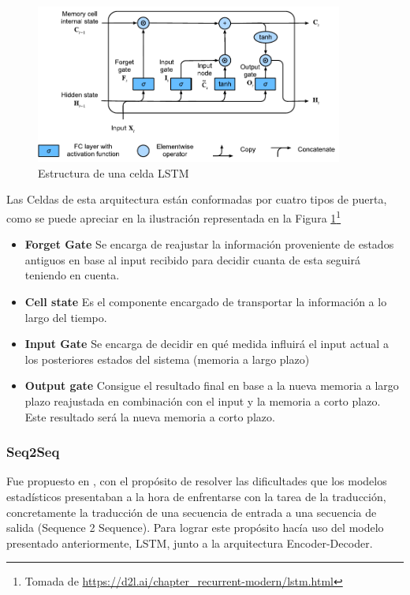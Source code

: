 \begin{figure}[h]
	\centering
	\includegraphics[width = 0.9\textwidth]{Imagenes/Vectorial/LSTM.pdf}
	\caption{Estructura de una celda LSTM}%
	\label{fig:LSTM}
\end{figure}

Las Celdas de esta arquitectura están conformadas por cuatro tipos de puerta, como se puede apreciar en la ilustración representada en la Figura \ref{fig:LSTM}\footnote{Tomada de \url{https://d2l.ai/chapter_recurrent-modern/lstm.html}}
\begin{itemize}
	\item\textbf{Forget Gate} Se encarga de reajustar la información proveniente de estados antiguos en base al input recibido para decidir cuanta de esta seguirá teniendo en cuenta.
	\item\textbf{Cell state} Es el componente encargado de transportar la información a lo largo del tiempo.
	\item\textbf{Input Gate} Se encarga de decidir en qué medida influirá el input actual a los posteriores estados del sistema (memoria a largo plazo)
	\item\textbf{Output gate} Consigue el resultado final en base a la nueva memoria a largo plazo reajustada en combinación con el input y la memoria a corto plazo. Este resultado será la nueva memoria a corto plazo.
\end{itemize}

\subsubsection{Seq2Seq}

Fue propuesto en \cite{sutskever2014sequence}, con el propósito de resolver las dificultades que los modelos estadísticos presentaban a la hora de enfrentarse con la tarea de la traducción, concretamente la traducción de una secuencia de entrada a una secuencia de salida (Sequence 2 Sequence). Para lograr este propósito hacía uso del modelo presentado anteriormente, LSTM, junto a la arquitectura Encoder-Decoder. 

